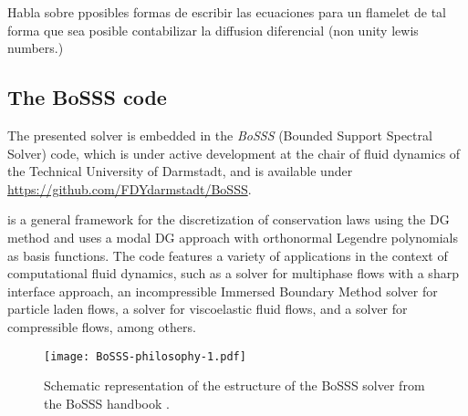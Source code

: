 \textcite{pitschConsistentFlameletFormulation1998} Habla sobre pposibles formas de escribir las ecuaciones para un flamelet de tal forma que sea posible contabilizar la diffusion diferencial (non unity lewis numbers.)



\subsection{The \gls{BoSSS} code}
The presented solver is embedded in the \textit{BoSSS} (Bounded Support Spectral Solver) code, which is under active development at the chair of fluid dynamics of the Technical University of Darmstadt, and is available under \href{https://github.com/FDYdarmstadt/BoSSS}{https://github.com/FDYdarmstadt/BoSSS}.

\BoSSS is a general framework for the discretization of conservation laws using the DG method and uses a modal DG approach with orthonormal Legendre polynomials as basis functions. The \BoSSS code features a variety of applications in the context of computational fluid dynamics, such as a solver for multiphase flows with a sharp interface approach, \parencite{kummerExtendedDiscontinuousGalerkin2017} an incompressible Immersed Boundary Method solver for particle laden flows,\parencite{krauseIncompressibleImmersedBoundary2017} a solver for viscoelastic fluid flows,\parencite{kikkerFullyCoupledHighorder} and a solver for compressible flows, \parencite{geisenhoferDiscontinuousGalerkinImmersed2019} among others.

\begin{figure}
	\texttt{[image: BoSSS-philosophy-1.pdf]}
	\caption{Schematic representation of the estructure of the \gls{BoSSS} solver from the \gls{BoSSS} handbook \parencite{kummer2020}.}
	\label{Fig:BoSSS}
\end{figure}